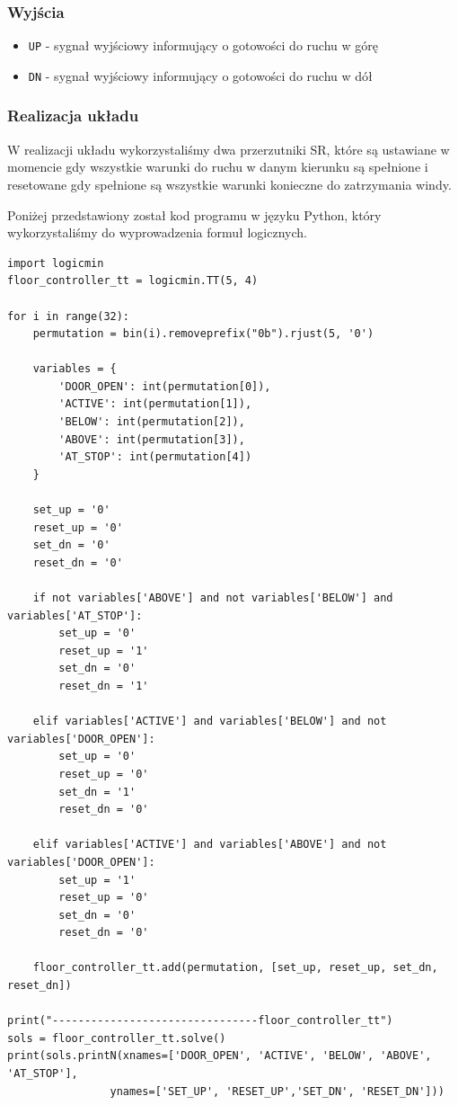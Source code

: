 \documentclass[a4paper]{article}
\begin{document}
\subsubsection{Wyjścia}
\begin{itemize}
    \item \verb|UP| - sygnał wyjściowy informujący o gotowości do ruchu w górę
    \item \verb|DN| - sygnał wyjściowy informujący o gotowości do ruchu w dół
\end{itemize}

\subsubsection{Realizacja układu}
W realizacji układu wykorzystaliśmy dwa przerzutniki SR, które są ustawiane w momencie gdy wszystkie
warunki do ruchu w danym kierunku są spełnione i resetowane gdy spełnione są wszystkie warunki konieczne
do zatrzymania windy.

Poniżej przedstawiony został kod programu w języku Python, który wykorzystaliśmy do wyprowadzenia
formuł logicznych.
\begin{verbatim}
import logicmin
floor_controller_tt = logicmin.TT(5, 4)

for i in range(32):
    permutation = bin(i).removeprefix("0b").rjust(5, '0')
    
    variables = {
        'DOOR_OPEN': int(permutation[0]),
        'ACTIVE': int(permutation[1]),
        'BELOW': int(permutation[2]),
        'ABOVE': int(permutation[3]),
        'AT_STOP': int(permutation[4])
    }

    set_up = '0'
    reset_up = '0'
    set_dn = '0'
    reset_dn = '0'

    if not variables['ABOVE'] and not variables['BELOW'] and variables['AT_STOP']:
        set_up = '0'
        reset_up = '1'
        set_dn = '0'
        reset_dn = '1'

    elif variables['ACTIVE'] and variables['BELOW'] and not variables['DOOR_OPEN']:
        set_up = '0'
        reset_up = '0'
        set_dn = '1'
        reset_dn = '0'

    elif variables['ACTIVE'] and variables['ABOVE'] and not variables['DOOR_OPEN']:
        set_up = '1'
        reset_up = '0'
        set_dn = '0'
        reset_dn = '0'

    floor_controller_tt.add(permutation, [set_up, reset_up, set_dn, reset_dn])

print("--------------------------------floor_controller_tt")
sols = floor_controller_tt.solve()
print(sols.printN(xnames=['DOOR_OPEN', 'ACTIVE', 'BELOW', 'ABOVE', 'AT_STOP'],
                ynames=['SET_UP', 'RESET_UP','SET_DN', 'RESET_DN']))
\end{verbatim}
\end{document}
